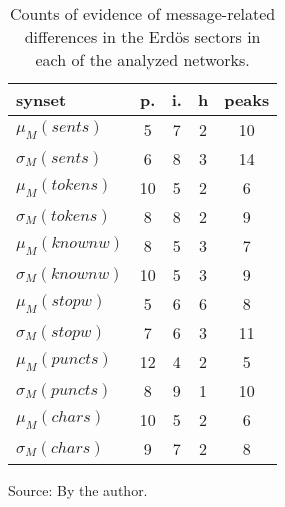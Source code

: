 \begin{table}[h!]
\begin{center}
\caption{Counts of evidence of message-related differences in the Erd\"os sectors in each of the analyzed networks.}
\begin{tabular}{| l || c | c | c || c |}\hline
{\bf synset} & {\bf p.} & {\bf i.} & {\bf h} & {\bf peaks} \\\hline\hline
$\mu_M(sents)$ & 5  & 7  & 2  & 10 \\
$\sigma_M(sents)$ & 6  & 8  & 3  & 14 \\\hline
$\mu_M(tokens)$ & 10  & 5  & 2  & 6 \\
$\sigma_M(tokens)$ & 8  & 8  & 2  & 9 \\\hline
$\mu_M(knownw)$ & 8  & 5  & 3  & 7 \\
$\sigma_M(knownw)$ & 10  & 5  & 3  & 9 \\\hline
$\mu_M(stopw)$ & 5  & 6  & 6  & 8 \\
$\sigma_M(stopw)$ & 7  & 6  & 3  & 11 \\\hline
$\mu_M(puncts)$ & 12  & 4  & 2  & 5 \\
$\sigma_M(puncts)$ & 8  & 9  & 1  & 10 \\\hline
$\mu_M(chars)$ & 10  & 5  & 2  & 6 \\
$\sigma_M(chars)$ & 9  & 7  & 2  & 8 \\\hline
\end{tabular}
\begin{flushleft}\footnotesize
		Source: By the author.\
\end{flushleft}
\end{center}
\end{table}
